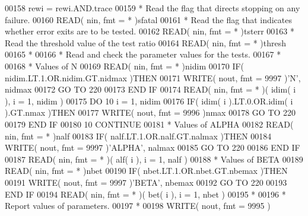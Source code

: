 \begin{DoxyCode}
00158       rewi = rewi.AND.trace
00159 \textcolor{comment}{*     Read the flag that directs stopping on any failure.}
00160       \textcolor{keyword}{READ}( nin, fmt = * )sfatal
00161 \textcolor{comment}{*     Read the flag that indicates whether error exits are to be tested.}
00162       \textcolor{keyword}{READ}( nin, fmt = * )tsterr
00163 \textcolor{comment}{*     Read the threshold value of the test ratio}
00164       \textcolor{keyword}{READ}( nin, fmt = * )thresh
00165 \textcolor{comment}{*}
00166 \textcolor{comment}{*     Read and check the parameter values for the tests.}
00167 \textcolor{comment}{*}
00168 \textcolor{comment}{*     Values of N}
00169       \textcolor{keyword}{READ}( nin, fmt = * )nidim
00170       \textcolor{keywordflow}{IF}( nidim.LT.1.OR.nidim.GT.nidmax )\textcolor{keywordflow}{THEN}
00171          \textcolor{keyword}{WRITE}( nout, fmt = 9997 )\textcolor{stringliteral}{'N'}, nidmax
00172          \textcolor{keywordflow}{GO TO} 220
00173 \textcolor{keywordflow}{      END IF}
00174       \textcolor{keyword}{READ}( nin, fmt = * )( idim( i ), i = 1, nidim )
00175       \textcolor{keywordflow}{DO} 10 i = 1, nidim
00176          \textcolor{keywordflow}{IF}( idim( i ).LT.0.OR.idim( i ).GT.nmax )\textcolor{keywordflow}{THEN}
00177             \textcolor{keyword}{WRITE}( nout, fmt = 9996 )nmax
00178             \textcolor{keywordflow}{GO TO} 220
00179 \textcolor{keywordflow}{         END IF}
00180    10 \textcolor{keywordflow}{CONTINUE}
00181 \textcolor{comment}{*     Values of ALPHA}
00182       \textcolor{keyword}{READ}( nin, fmt = * )nalf
00183       \textcolor{keywordflow}{IF}( nalf.LT.1.OR.nalf.GT.nalmax )\textcolor{keywordflow}{THEN}
00184          \textcolor{keyword}{WRITE}( nout, fmt = 9997 )\textcolor{stringliteral}{'ALPHA'}, nalmax
00185          \textcolor{keywordflow}{GO TO} 220
00186 \textcolor{keywordflow}{      END IF}
00187       \textcolor{keyword}{READ}( nin, fmt = * )( alf( i ), i = 1, nalf )
00188 \textcolor{comment}{*     Values of BETA}
00189       \textcolor{keyword}{READ}( nin, fmt = * )nbet
00190       \textcolor{keywordflow}{IF}( nbet.LT.1.OR.nbet.GT.nbemax )\textcolor{keywordflow}{THEN}
00191          \textcolor{keyword}{WRITE}( nout, fmt = 9997 )\textcolor{stringliteral}{'BETA'}, nbemax
00192          \textcolor{keywordflow}{GO TO} 220
00193 \textcolor{keywordflow}{      END IF}
00194       \textcolor{keyword}{READ}( nin, fmt = * )( bet( i ), i = 1, nbet )
00195 \textcolor{comment}{*}
00196 \textcolor{comment}{*     Report values of parameters.}
00197 \textcolor{comment}{*}
00198       \textcolor{keyword}{WRITE}( nout, fmt = 9995 )

\end{DoxyCode}
